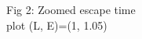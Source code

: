 \documentclass[preview]{standalone}
\begin{document}
\begin{center}
Fig 2: Zoomed escape time\\ plot (L, E)=(1, 1.05)
\end{center}
\end{document}
